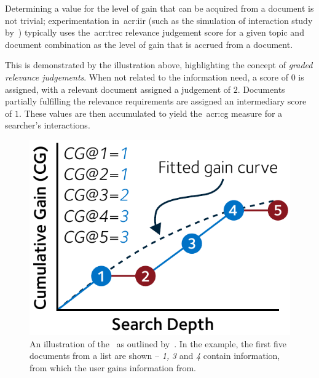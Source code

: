 Determining a value for the level of gain that can be acquired from a document is not trivial; experimentation in~\gls{acr:iir} (such as the simulation of interaction study by~\cite{pakkonen2015behavioural_dimensions}) typically uses the~\gls{acr:trec} relevance judgement score for a given topic and document combination as the level of gain that is accrued from a document.

\vspace{5mm}
\begin{figure}[h!]
    \centering
    \label{fig:graded}
\end{figure}

This is demonstrated by the illustration above, highlighting the concept of \emph{graded relevance judgements}. When not related to the information need, a score of $0$ is assigned, with a relevant document assigned a judgement of $2$. Documents partially fulfilling the relevance requirements are assigned an intermediary score of $1$. These values are then accumulated to yield the~\gls{acr:cg} measure for a searcher's interactions.

\begin{figure}
    \begin{center}
    \vspace*{-10mm}
    \includegraphics[width=1\textwidth]{figures/ch2-cg.pdf}
    \end{center}
    \vspace*{-4mm}
    \caption[Cumulative Gain]{An illustration of the~ as outlined by~\cite{jarvelin2000cg, jarvelin2002cg}. In the example, the first five documents from a list are shown – \emph{1,} \emph{3} and \emph{4} contain information, from which the user gains information from.}
    \label{fig:cg}
\end{figure}

